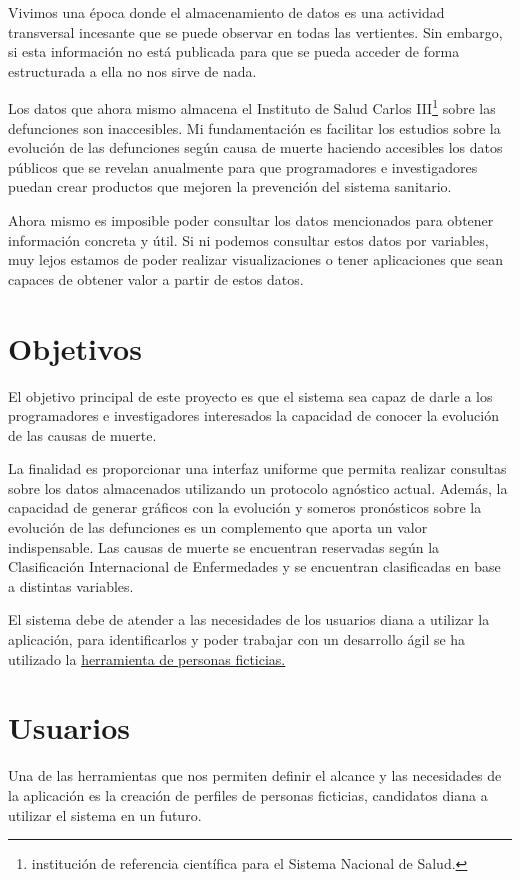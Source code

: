 Vivimos una época donde el almacenamiento de datos es una actividad transversal incesante
que se puede observar en todas las vertientes. Sin embargo, si esta información no está
publicada para que se pueda acceder de forma estructurada a ella no nos sirve de nada. 

Los datos que ahora mismo almacena el Instituto de Salud Carlos III\footnote{institución de
referencia científica para el Sistema Nacional de Salud.} sobre las defunciones son inaccesibles.  Mi
fundamentación es facilitar los estudios sobre la evolución de las defunciones según causa
de muerte haciendo accesibles los datos públicos que se revelan anualmente para que
programadores e investigadores puedan crear productos que mejoren la prevención del sistema sanitario.

Ahora mismo es imposible poder consultar los datos mencionados para obtener información
concreta y útil.  Si ni podemos consultar estos datos por variables, muy lejos estamos de
poder realizar visualizaciones o tener aplicaciones que sean capaces de obtener valor a
partir de estos datos.

\section{Objetivos}
\label{sec:obj}
El objetivo principal de este proyecto es que el sistema sea capaz de darle a los
programadores e investigadores interesados la capacidad de conocer la evolución de las causas de muerte. 

La finalidad es proporcionar una interfaz uniforme que permita realizar consultas
sobre los datos almacenados utilizando un protocolo agnóstico actual. Además, la
capacidad de generar gráficos con la evolución y someros pronósticos sobre la evolución 
de las defunciones es un complemento que aporta un valor indispensable. Las causas de
muerte se encuentran reservadas según la Clasificación Internacional
de Enfermedades y se encuentran clasificadas en base a distintas variables. 

El sistema debe de atender a las necesidades de los usuarios diana a utilizar la aplicación, para
identificarlos y poder trabajar con un desarrollo ágil se ha utilizado la
\hyperref[sec:usu]{herramienta de personas ficticias.}

\section{Usuarios}
\label{sec:usu}
Una de las herramientas que nos permiten definir el alcance y las necesidades de la
aplicación es la creación de perfiles de personas ficticias, candidatos diana a utilizar
el sistema en un futuro.

